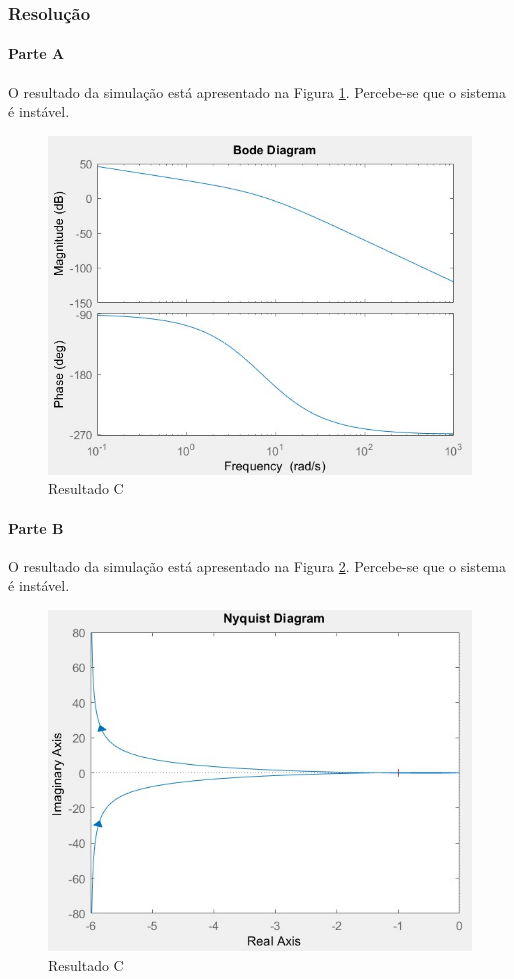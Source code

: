 \documentclass[
]{book}
\theoremstyle{definition}
\theoremstyle{definition}
\theoremstyle{definition}
\theoremstyle{remark}
\begin{document}
\hypertarget{resoluuxe7uxe3o-35}{%
\subsubsection*{Resolução}\label{resoluuxe7uxe3o-35}}

\hypertarget{parte-a-14}{%
\paragraph{Parte A}\label{parte-a-14}}

O resultado da simulação está apresentado na Figura \ref{fig:fig10RA5}. Percebe-se que o sistema é instável.

\begin{figure}

{\centering \includegraphics[width=0.5\linewidth]{Imagens/Lab10/Resolução/fig5} 

}

\caption{Resultado C}\label{fig:fig10RA5}
\end{figure}

\hypertarget{parte-b-14}{%
\paragraph{Parte B}\label{parte-b-14}}

O resultado da simulação está apresentado na Figura \ref{fig:fig10RA6}. Percebe-se que o sistema é instável.

\begin{figure}

{\centering \includegraphics[width=0.5\linewidth]{Imagens/Lab10/Resolução/fig6} 

}

\caption{Resultado C}\label{fig:fig10RA6}
\end{figure}
\end{document}
